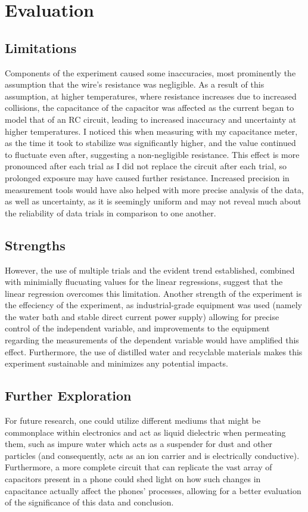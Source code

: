 \documentclass[12pt]{article}
\numberwithin{equation}{section}
\begin{document}
\section{Evaluation}
\subsection{Limitations}
Components of the experiment caused some inaccuracies, most prominently the assumption that the wire's resistance was negligible. As a result of this assumption, at higher temperatures, where resistance increases due to increased collisions, the capacitance of the capacitor was affected as the current began to model that of an RC circuit, leading to increased inaccuracy and uncertainty at higher temperatures. I noticed this when measuring with my capacitance meter, as the time it took to stabilize was significantly higher, and the value continued to fluctuate even after, suggesting a non-negligible resistance. This effect is more pronounced after each trial as I did not replace the circuit after each trial, so prolonged exposure may have caused further resistance. Increased precision in measurement tools would have also helped with more precise analysis of the data, as well as uncertainty, as it is seemingly uniform and may not reveal much about the reliability of data trials in comparison to one another.
\subsection{Strengths}
However, the use of multiple trials and the evident trend established, combined with minimially flucuating values for the linear regressions, suggest that the linear regression overcomes this limitation. Another strength of the experiment is the effeciency of the experiment, as industrial-grade equipment was used (namely the water bath and stable direct current power supply) allowing for precise control of the independent variable, and improvements to the equipment regarding the measurements of the dependent variable would have amplified this effect. Furthermore, the use of distilled water and recyclable materials makes this experiment sustainable and minimizes any potential impacts.

\subsection{Further Exploration}
 For future research, one could utilize different mediums that might be commonplace within electronics and act as liquid dielectric when permeating them, such as impure water which acts as a suspender for dust and other particles (and consequently, acts as an ion carrier and is electrically conductive). Furthermore, a more complete circuit that can replicate the vast array of capacitors present in a phone could shed light on how such changes in capacitance actually affect the phones' processes, allowing for a better evaluation of the significance of this data and conclusion.

\printbibliography
\end{document}
